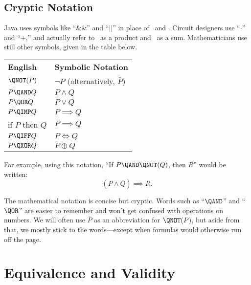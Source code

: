 \subsection{Cryptic Notation}
Java uses symbols like ``$\&\&$'' and ``$||$'' in place of \QAND\ and
\QOR.  Circuit designers use ``$\cdot$'' and ``$+$,'' and actually refer
to \QAND\ as a product and \QOR\ as a sum.  Mathematicians use still
other symbols, given in the table below.
%
\begin{center}
\begin{tabular}{ll}
\textbf{English} & \textbf{Symbolic Notation} \\[1ex]
$\QNOT(P)$ & $\neg P$ \quad (alternatively, $\bar{P}$) \\
$P \QAND Q$ & $P \land Q$ \\
$P \QOR Q$ & $P \lor Q$ \\
$P \QIMP Q$ & $P \implies Q$ \\
if $P$ then $Q$ & $P \implies Q$ \\
$P \QIFF Q$ & $P \iff Q$\\
$P \QXOR Q$ & $P \oplus Q$
\end{tabular}
\end{center}
%
For example, using this notation, ``If $P \QAND \QNOT(Q)$, then $R$''
would be written:
%
\[
    (P \land \bar{Q}) \implies R.
\]

The mathematical notation is concise but cryptic.  Words such as
``$\QAND$'' and ``$\QOR$'' are easier to remember and won't get
confused with operations on numbers.  We will often use $\bar{P}$ as
an abbreviation for $\QNOT(P)$, but aside from that, we mostly stick
to the words---except when formulas would otherwise run off the page.

\begin{problems}
\classproblems
{}

\homeworkproblems
{}

\examproblems
{}
\end{problems}

\section{Equivalence and Validity}\label{equiv_valid_sec}

